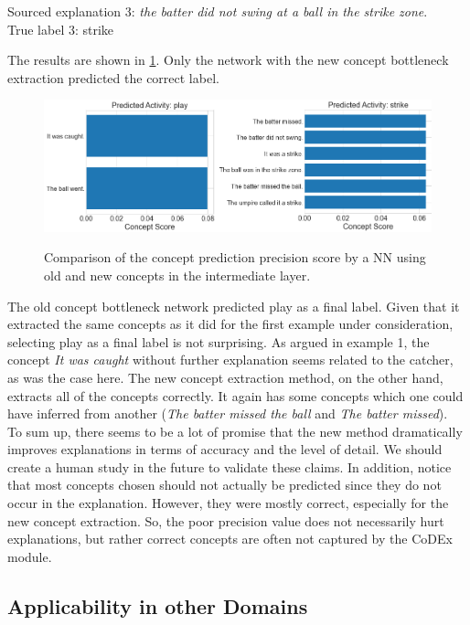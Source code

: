 Sourced explanation 3: \emph{the batter did not swing at a ball in the strike zone}. \\
True label 3: strike

The results are shown in \ref{concept-results-3}.
Only the network with the new concept bottleneck extraction predicted the correct label.

\begin{figure}[h]
\caption{Comparison of the concept prediction precision score by a NN using old and new concepts in the intermediate layer.}
\centering
\includegraphics[width=\textwidth]{concept-bottleneck-pipeline/explanations_concepts3.png}
\label{concept-results-3}
\end{figure}

The old concept bottleneck network predicted play as a final label. 
Given that it extracted the same concepts as it did for the first example under consideration, selecting play as a final label is not surprising.
As argued in example 1, the concept \emph{It was caught} without further explanation seems related to the catcher, as was the case here.
The new concept extraction method, on the other hand, extracts all of the concepts correctly. 
It again has some concepts which one could have inferred from another (\emph{The batter missed the ball} and \emph{The batter missed}). \\


To sum up, there seems to be a lot of promise that the new method dramatically improves explanations in terms of accuracy and the level of detail.
We should create a human study in the future to validate these claims.
In addition, notice that most concepts chosen should not actually be predicted since they do not occur in the explanation.
However, they were mostly correct, especially for the new concept extraction.
So, the poor precision value does not necessarily hurt explanations, but rather correct concepts are often not captured by the CoDEx module.

\subsection{Applicability in other Domains}
\label{applicability-in-other-domains}

